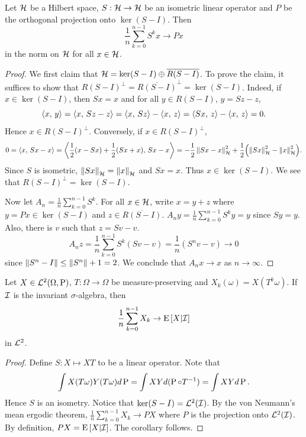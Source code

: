 \begin{theorem}
    Let $\H$ be a Hilbert space, $S:\H\to\H$ be an isometric linear 
    operator and $P$ be the orthogonal projection onto $\ker(S-I)$. Then 
    \begin{equation*}
        \frac{1}{n}\sum_{k=0}^{n-1}S^kx\to Px
    \end{equation*}
    in the norm on $\H$ for all $x\in\H$. 
\end{theorem}
\begin{proof}
    We first claim that $\H = \ker(S-I)\oplus \overline{R(S-I)}$. To 
    prove the claim, it suffices to show that $R(S-I)^\perp = \overline{R(S-I)}^\perp = \ker(S-I)$. 
    Indeed, if $x\in \ker(S-I)$, then $Sx = x$ and for all $y\in R(S-I)$,  
    $y = Sz - z$, 
    \begin{equation*}
        \inp{x}{y} = \inp{x}{Sz-z} = \inp{x}{Sz} - \inp{x}{z} = \inp{Sx}{z} - \inp{x}{z} = 0. 
    \end{equation*}
    Hence $x\in R(S-I)^\perp$. Conversely, if $x\in R(S-I)^\perp$, 
    \begin{equation*}
        0 = \inp{x}{Sx-x} = \inp{\frac{1}{2}(x-Sx) + \frac{1}{2}(Sx + x)}{Sx-x} 
        = -\frac{1}{2}\norm{Sx-x}_\H^2 + \frac{1}{2}\pth{\norm{Sx}_\H^2 - \norm{x}_\H^2}.
    \end{equation*}
    Since $S$ is isometric, $\norm{Sx}_\H = \norm{x}_\H$ and $Sx = x$. Thus 
    $x\in\ker(S-I)$. We see that $R(S-I)^\perp = \ker(S-I)$. 

    Now let $A_n = \frac{1}{n}\sum_{k=0}^{n-1}S^k$. For all $x\in\H$, write $x = y+z$ where 
    $y = Px\in\ker(S-I)$ and $z\in\overline{R(S-I)}$. $A_ny = \frac{1}{n}\sum_{k=0}^{n-1}S^ky = y$ 
    since $Sy = y$. Also, there is $v$ such that $z = Sv-v$.
    \begin{equation*}
        A_nz = \frac{1}{n}\sum_{k=0}^{n-1}S^k(Sv-v) = \frac{1}{n}(S^nv - v)\to 0
    \end{equation*}
    since $\norm{S^n-I}\leq \norm{S^n}+1 = 2$. We conclude that $A_nx\to x$ 
    as $n\to\infty$. 
\end{proof}

\begin{corollary}
    Let $X\in\L^2(\Omega,\P)$, $T:\Omega\to\Omega$ be measure-preserving 
    and $X_k(\omega) = X(T^k\omega)$. If $\I$ is the invariant $\sigma$-algebra, 
    then 
    \begin{equation*}
        \frac{1}{n}\sum_{k=0}^{n-1}X_k\to \E\sbrc{X|\I}
    \end{equation*}
    in $\L^2$.
\end{corollary}
\begin{proof}
    Define $S:X\mapsto XT$ to be a linear operator. Note that 
    \begin{equation*}
        \int X(T\omega)Y(T\omega)d\P = \int XYd(\P\circ T^{-1}) = \int XYd\P.
    \end{equation*}
    Hence $S$ is an isometry. Notice that $\ker(S-I) = \L^2(\I)$. 
    By the von Neumann's mean ergodic theorem, $\frac{1}{n}\sum_{k=0}^{n-1}X_k\to PX$ 
    where $P$ is the projection onto $\L^2(\I)$. By definition, 
    $PX = \E\sbrc{X|\I}$. The corollary follows. 
\end{proof}

